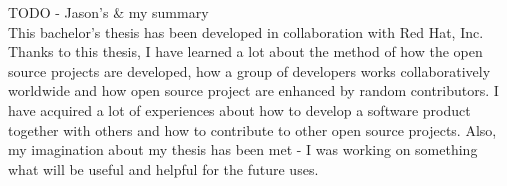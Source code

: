 {\color{red}TODO - Jason's \& my summary}\\

This bachelor's thesis has been developed in collaboration with Red Hat, Inc. Thanks to this thesis, I have learned a lot about the method of how the open source projects are developed, how a group of developers works collaboratively worldwide and how open source project are enhanced by random contributors. I have acquired a lot of experiences about how to develop a software product together with others and how to contribute to other open source projects. Also, my imagination about my thesis has been met - I was working on something what will be useful and helpful for the future uses.
